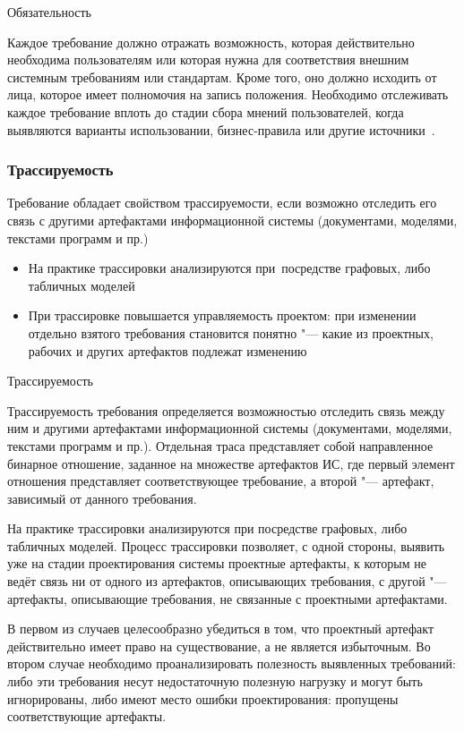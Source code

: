 \documentclass{../industrial-development}
\begin{document}
\lecturenotes

\alert{Обязательность}

Каждое требование должно отражать возможность, которая действительно необходима пользователям или которая нужна для соответствия внешним системным требованиям или стандартам. Кроме того, оно должно исходить от лица, которое имеет полномочия на запись положения. Необходимо отслеживать каждое требование вплоть до стадии сбора мнений пользователей, когда выявляются варианты использовании, бизнес-правила или другие источники~\cite[с.~24]{Wiegers}.

\begin{frame} \frametitle{Трассируемость}

Требование обладает свойством \alert{трассируемости}, если возможно отследить его связь с другими артефактами информационной системы (документами, моделями, текстами программ и пр.)
\begin{itemize}
\item На практике трассировки анализируются при~посредстве графовых, либо табличных моделей
\item При трассировке повышается управляемость проектом: при изменении отдельно взятого требования становится понятно "--- какие из проектных, рабочих и других артефактов подлежат изменению
 \end{itemize}
\end{frame}

\lecturenotes

\alert{Трассируемость}

Трассируемость требования определяется возможностью
отследить связь между ним и другими артефактами информационной системы (документами, моделями, текстами программ и пр.). Отдельная траса представляет собой направленное бинарное отношение, заданное на множестве артефактов ИС, где первый
элемент отношения представляет соответствующее требование, а второй "--- артефакт, зависимый от данного требования. 

На практике трассировки анализируются при посредстве графовых, либо табличных моделей. Процесс трассировки позволяет, с одной стороны, выявить уже на стадии проектирования системы проектные артефакты, к которым не ведёт связь ни от одного из артефактов, описывающих требования, с другой "--- артефакты, описывающие требования, не связанные с проектными артефактами.

В первом из случаев целесообразно убедиться в том, что проектный артефакт действительно имеет право на существование, а не является
избыточным. Во втором случае необходимо проанализировать полезность выявленных требований: либо эти требования несут недостаточную полезную нагрузку и могут быть игнорированы, либо имеют место ошибки проектирования: пропущены соответствующие
артефакты.
\end{document}
